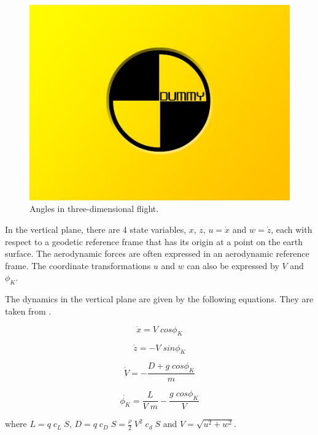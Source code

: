\begin{figure}[h]
	\includegraphics[width=\textwidth]{src/pics/dummy.jpg}
	\caption{Angles in three-dimensional flight.}
	\label{fig:coords2d}
\end{figure}

In the vertical plane, there are 4 state variables, $x$, $z$, $u=\dot{x}$ and $w=\dot{z}$, each with respect to a geodetic reference frame that has its origin at a point on the earth surface. The aerodynamic forces are often expressed in an aerodynamic reference frame. The coordinate transformations $u$ and $w$ can also be expressed by $V$ and $\phi_K$.

The dynamics in the vertical plane are given by the following equations. They are taken from \cite{Fichter2009}. 

\begin{equation}
\dot{x} = V \; cos\phi_K
\end{equation}

\begin{equation}
\dot{z} = - V \; sin\phi_K
\end{equation}

\begin{equation}
\dot{V} = -\frac{D + g \; cos\phi_K}{m}
\end{equation}

\begin{equation}
\dot{\phi_K} = \frac{L}{V \; m} - \frac{g \; cos{\phi_K}}{V} 
\label{eq:dotgamma}
\end{equation}

where $L = q \; c_L \; S$, $D = q \; c_D \; S = \frac{\rho}{2} \; V^2 \; c_d \; S$ and $V=\sqrt{u^2+w^2}$.

